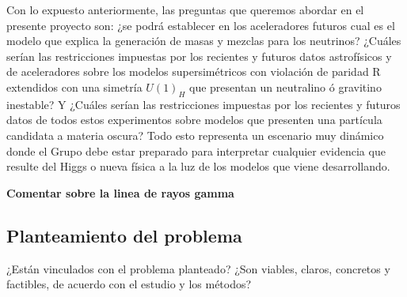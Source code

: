 \begin{ideas}
Con lo expuesto anteriormente, las preguntas que queremos abordar en el presente proyecto son: 
¿se podrá establecer en los aceleradores futuros cual es el modelo que
explica la generación de masas y mezclas para los neutrinos? ¿Cuáles serían las restricciones 
impuestas por los recientes y futuros datos astrofísicos y de aceleradores sobre los modelos supersimétricos con violación de paridad R extendidos con una simetría $U(1)_H$ que presentan un neutralino ó gravitino inestable? Y ¿Cuáles serían las restricciones impuestas por los recientes y futuros datos de todos estos experimentos sobre  modelos que presenten una partícula candidata a materia oscura?
Todo esto representa un escenario muy dinámico donde el Grupo debe estar preparado para interpretar cualquier evidencia que resulte del Higgs o nueva física a la luz de los modelos que viene desarrollando.




\textbf{Comentar sobre la linea de rayos gamma \cite{1011.3786}}
\subsection{Planteamiento del problema}
\begin{instrucciones}
  ¿Están vinculados con el problema planteado? ¿Son viables, claros, concretos y factibles, de acuerdo con el estudio y los métodos?
\end{instrucciones}


\end{ideas}
